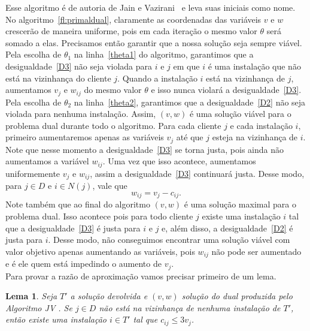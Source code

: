 \documentclass[12pt]{article}
\newtheorem{lemma}[theorem]{Lema}
\begin{document}
Esse algoritmo é de autoria de Jain e Vazirani~\cite{JV} e leva suas iniciais como nome.
No algoritmo~\ref{fl:primaldual}, claramente as coordenadas das variáveis $v$ e $w$ crescerão de maneira uniforme, pois em cada iteração o mesmo valor $\theta$ será somado a elas. Precisamos então garantir que a nossa solução seja sempre viável. Pela escolha de $\theta_1$ na linha~\ref{theta1} do algoritmo, garantimos que a desigualdade~\eqref{D3} não seja violada para $i$ e $j$ em que $i$ é uma instalação que não está na vizinhança do cliente $j$. Quando a instalação $i$ está na vizinhança de $j$, aumentamos $v_j$ e $w_{ij}$ do mesmo valor $\theta$ e isso nunca violará a desigualdade~\eqref{D3}. 
Pela escolha de $\theta_2$ na linha~\ref{theta2}, garantimos que a desigualdade~\eqref{D2} não seja violada para nenhuma instalação. 
Assim, $(v,w)$ é uma solução viável para o problema dual durante todo o algoritmo.
Para cada cliente $j$ e cada instalação $i$, primeiro aumentaremos apenas as variáveis $v_j$ até que $j$ esteja na vizinhança de $i$. Note que nesse momento a desigualdade~\eqref{D3} se torna justa, pois ainda não aumentamos a variável $w_{ij}$. Uma vez que isso acontece, aumentamos uniformemente $v_j$ e $w_{ij}$, assim a desigualdade~\eqref{D3} continuará justa. Desse modo, para $j \in D$ e $i \in N(j)$, vale que 
\begin{equation}\label{Djusta:*}  
w_{ij} = v_j - c_{ij}.
\end{equation}
Note também que ao final do algoritmo $(v,w)$ é uma solução maximal para o problema dual. Isso acontece pois para todo cliente $j$ existe uma instalação $i$ tal que a desigualdade~\eqref{D3} é justa para $i$ e $j$ e, além disso, a desigualdade~\eqref{D2} é justa para $i$. Desse modo, não conseguimos encontrar uma solução viável com valor objetivo apenas aumentando as variáveis, pois $w_{ij}$ não pode ser aumentado e é ele quem está impedindo o aumento de $v_j$. \\
Para provar a razão de aproximação vamos precisar primeiro de um lema.
\begin{lemma}
    \label{lemma:3.9}
    Seja $T'$ a solução devolvida e $(v,w)$ solução do dual produzida pelo Algoritmo {\sc JV }. Se $j \in D$ não está na vizinhança de nenhuma instalação de $T'$, então existe uma instalação $i \in T'$ tal que $c_{ij} \leq 3v_j$.
\end{lemma}
\end{document}
